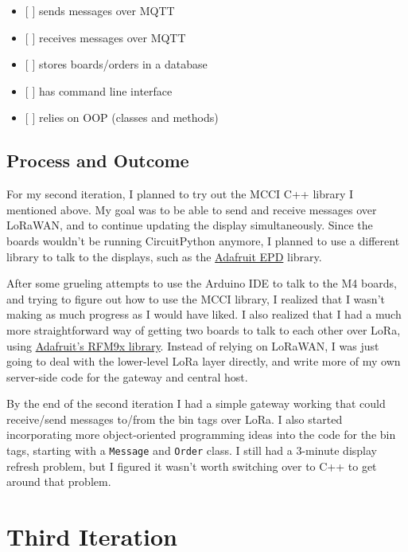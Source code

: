 \documentclass{article}
\begin{document}
\begin{itemize}
\item
  {[} {]} sends messages over MQTT
\item
  {[} {]} receives messages over MQTT
\item
  {[} {]} stores boards/orders in a database
\item
  {[} {]} has command line interface
\item
  {[} {]} relies on OOP (classes and methods)
\end{itemize}

\subsection{Process and Outcome}\label{process-and-outcome-1}

For my second iteration, I planned to try out the MCCI C++ library I
mentioned above. My goal was to be able to send and receive messages
over LoRaWAN, and to continue updating the display simultaneously. Since
the boards wouldn't be running CircuitPython anymore, I planned to use a
different library to talk to the displays, such as the
\href{https://github.com/adafruit/Adafruit_EPD}{Adafruit EPD} library.

After some grueling attempts to use the Arduino IDE to talk to the M4
boards, and trying to figure out how to use the MCCI library, I realized
that I wasn't making as much progress as I would have liked. I also
realized that I had a much more straightforward way of getting two
boards to talk to each other over LoRa, using
\href{https://github.com/adafruit/Adafruit_CircuitPython_RFM9x}{Adafruit's
RFM9x library}. Instead of relying on LoRaWAN, I was just going to deal
with the lower-level LoRa layer directly, and write more of my own
server-side code for the gateway and central host.

By the end of the second iteration I had a simple gateway working that
could receive/send messages to/from the bin tags over LoRa. I also
started incorporating more object-oriented programming ideas into the
code for the bin tags, starting with a \texttt{Message} and
\texttt{Order} class. I still had a 3-minute display refresh problem,
but I figured it wasn't worth switching over to C++ to get around that
problem.

\section{Third Iteration}\label{third-iteration}
\end{document}
